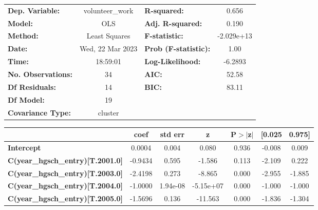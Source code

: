 \begin{center}
\begin{tabular}{lclc}
\toprule
\textbf{Dep. Variable:}                  & volunteer\_work  & \textbf{  R-squared:         } &     0.656   \\
\textbf{Model:}                          &       OLS        & \textbf{  Adj. R-squared:    } &     0.190   \\
\textbf{Method:}                         &  Least Squares   & \textbf{  F-statistic:       } & -2.029e+13  \\
\textbf{Date:}                           & Wed, 22 Mar 2023 & \textbf{  Prob (F-statistic):} &     1.00    \\
\textbf{Time:}                           &     18:59:01     & \textbf{  Log-Likelihood:    } &   -6.2893   \\
\textbf{No. Observations:}               &          34      & \textbf{  AIC:               } &     52.58   \\
\textbf{Df Residuals:}                   &          14      & \textbf{  BIC:               } &     83.11   \\
\textbf{Df Model:}                       &          19      & \textbf{                     } &             \\
\textbf{Covariance Type:}                &     cluster      & \textbf{                     } &             \\
\bottomrule
\end{tabular}
\begin{tabular}{lcccccc}
                                         & \textbf{coef} & \textbf{std err} & \textbf{z} & \textbf{P$> |$z$|$} & \textbf{[0.025} & \textbf{0.975]}  \\
\midrule
\textbf{Intercept}                       &       0.0004  &        0.004     &     0.080  &         0.936        &       -0.008    &        0.009     \\
\textbf{C(year\_hgsch\_entry)[T.2001.0]} &      -0.9434  &        0.595     &    -1.586  &         0.113        &       -2.109    &        0.222     \\
\textbf{C(year\_hgsch\_entry)[T.2003.0]} &      -2.4198  &        0.273     &    -8.865  &         0.000        &       -2.955    &       -1.885     \\
\textbf{C(year\_hgsch\_entry)[T.2004.0]} &      -1.0000  &     1.94e-08     & -5.15e+07  &         0.000        &       -1.000    &       -1.000     \\
\textbf{C(year\_hgsch\_entry)[T.2005.0]} &      -1.5696  &        0.136     &   -11.563  &         0.000        &       -1.836    &       -1.304     \\

\end{tabular}
\end{center}
